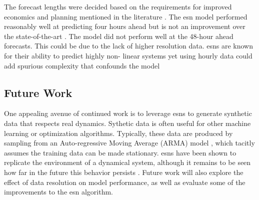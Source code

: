 The forecast lengths were decided based on the requirements for improved
economics and planning mentioned in the literature
 \cite{wang_quantifying_2016,mc_garrigle_quantifying_2015,brancucci_martinez-anido_value_2016}. The \gls{esn} model performed reasonably well at predicting
 four hours ahead but is not an improvement over the state-of-the-art
 \cite{wang_quantifying_2016,powers_weather_2017}. The model did not perform
 well at the 48-hour ahead forecasts. This could be due to the lack of higher
 resolution data. \glspl{esn} are known for their ability to predict highly non-
 linear systems \cite{jaeger_harnessing_2004,lukosevicius_reservoir_2009} yet
 using hourly data could add spurious complexity that confounds the model
 \cite{garland_model-free_2014}

\subsection{Future Work}
One appealing avenue of continued work is to leverage \glspl{esn} to generate
synthetic data that respects real dynamics. Sythetic data is often useful for
other machine learning or optimization algorithms. Typically, these data are
produced by sampling from an Auto-regressive Moving Average (ARMA) model \cite{baker_optimal_2018, garcia_dynamic_2016}, which tacitly assumes the
training data can be made stationary. \glspl{esn} have been shown to replicate
the environment of a dynamical system, although it remains to be seen how far
in the future this behavior persists \cite{pathak_using_2017,pathak_model-free_2018}.
Future work will also explore the effect of data resolution on model
performance, as well as evaluate some of the improvements to the \gls{esn}
algorithm.
